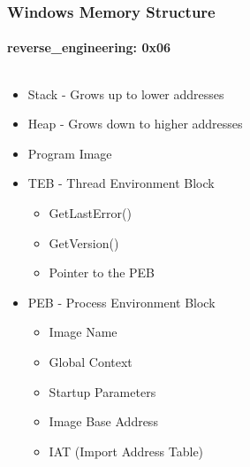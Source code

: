 \documentclass[aspectratio=169]{beamer}
\begin{document}
\begin{frame}
  \frametitle{Windows Memory Structure}
  \framesubtitle{reverse\_engineering: 0x06}
  \begin{columns}
    \begin{column}{.6\textwidth}
      \begin{itemize}
      \item{Stack - Grows up to lower addresses}
      \item{Heap - Grows down to higher addresses}
      \item{Program Image}
      \item{TEB - Thread Environment Block}
        \begin{itemize}
        \item{GetLastError()}
        \item{GetVersion()}
        \item{Pointer to the PEB}
        \end{itemize}
      \item{PEB - Process Environment Block}
        \begin{itemize}
        \item{Image Name}
        \item{Global Context}
        \item{Startup Parameters}
        \item{Image Base Address}
        \item{IAT (Import Address Table)}
        \end{itemize}
      \end{itemize}
    \end{column}
    \hfill
    \begin{column}{.7\textwidth}
      \begin{center}

\end{center}
\end{column}
\end{columns}
\end{frame}
\end{document}
